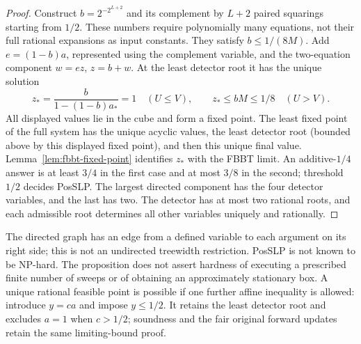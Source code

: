 \begin{proof}
Construct $b=2^{-2^{L+2}}$ and its complement by $L+2$ paired squarings
starting from $1/2$. These numbers require polynomially many equations,
not their full rational expansions as input constants. They satisfy
$b\le1/(8M)$. Add $e=(1-b)a$, represented using the complement variable,
and the two-equation component $w=ez$, $z=b+w$.
At the least detector root it has the unique solution
\[
 z_*=\frac{b}{1-(1-b)a_*}
 =1\quad(U\le V),\qquad z_*\le bM\le1/8\quad(U>V).
\]
All displayed values lie in the cube and form a fixed point. The least
fixed point of the full system has the unique acyclic values, the least
detector root (bounded above by this displayed fixed point), and then
this unique final value. Lemma~\ref{lem:fbbt-fixed-point} identifies $z_*$
with the FBBT limit. An additive-$1/4$ answer is at least $3/4$ in the
first case and at most $3/8$ in the second; threshold $1/2$ decides PosSLP.
The largest directed component has the four detector variables, and the
last has two. The detector has at most two rational roots, and each
admissible root determines all other variables uniquely and rationally.
\end{proof}
The directed graph has an edge from a defined variable to each argument
on its right side; this is not an undirected treewidth restriction.
PosSLP is not known to be NP-hard. The proposition does not assert
hardness of executing a prescribed finite number of sweeps or of obtaining
an approximately stationary box. A unique rational feasible point is
possible if one further affine inequality is allowed: introduce $y=ca$
and impose $y\le1/2$. It retains the least detector root and excludes
$a=1$ when $c>1/2$; soundness and the fair original forward updates retain
the same limiting-bound proof.

